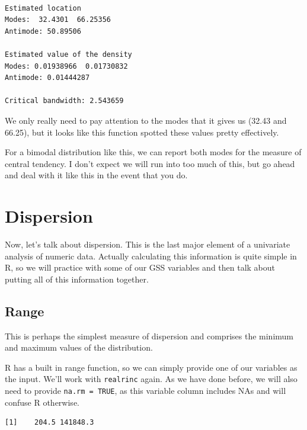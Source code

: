 \documentclass[
  letterpaper,
  DIV=11,
  numbers=noendperiod]{scrreprt}
\newenvironment{Shaded}{\begin{snugshade}}{\end{snugshade}}
\newcommand{\AttributeTok}[1]{\textcolor[rgb]{0.40,0.45,0.13}{#1}}
\newcommand{\ConstantTok}[1]{\textcolor[rgb]{0.56,0.35,0.01}{#1}}
\newcommand{\FunctionTok}[1]{\textcolor[rgb]{0.28,0.35,0.67}{#1}}
\newcommand{\NormalTok}[1]{\textcolor[rgb]{0.00,0.23,0.31}{#1}}
\newcommand{\SpecialCharTok}[1]{\textcolor[rgb]{0.37,0.37,0.37}{#1}}
\begin{document}
\begin{verbatim}

Estimated location
Modes:  32.4301  66.25356 
Antimode: 50.89506 

Estimated value of the density
Modes: 0.01938966  0.01730832 
Antimode: 0.01444287 

Critical bandwidth: 2.543659
\end{verbatim}

We only really need to pay attention to the modes that it gives us
(32.43 and 66.25), but it looks like this function spotted these values
pretty effectively.

For a bimodal distribution like this, we can report both modes for the
measure of central tendency. I don't expect we will run into too much of
this, but go ahead and deal with it like this in the event that you do.

\section{Dispersion}\label{dispersion}

Now, let's talk about dispersion. This is the last major element of a
univariate analysis of numeric data. Actually calculating this
information is quite simple in R, so we will practice with some of our
GSS variables and then talk about putting all of this information
together.

\subsection{Range}\label{range}

This is perhaps the simplest measure of dispersion and comprises the
minimum and maximum values of the distribution.

R has a built in range function, so we can simply provide one of our
variables as the input. We'll work with \texttt{realrinc} again. As we
have done before, we will also need to provide \texttt{na.rm\ =\ TRUE},
as this variable column includes NAs and will confuse R otherwise.

\begin{Shaded}
\end{Shaded}

\begin{verbatim}
[1]    204.5 141848.3
\end{verbatim}
\end{document}
